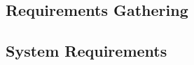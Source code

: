 
\subsection{Requirements Gathering}
\label{gathering}


\subsection{System Requirements}
\label{SR}


